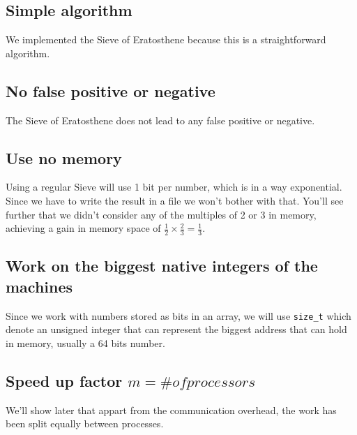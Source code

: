 

\subsection{Simple algorithm}
We implemented the Sieve of Eratosthene because this is a straightforward algorithm.
\subsection{No false positive or negative}
The Sieve of Eratosthene does not lead to any false positive or negative.
\subsection{Use no memory}
Using a regular Sieve will use 1 bit per number, which is in a way exponential. Since we have to write the result in a file we won't bother with that. You'll see further that we didn't consider any of the multiples of 2 or 3 in memory, achieving a gain in memory space of $\frac{1}{2}\times\frac{2}{3} = \frac{1}{3}$.
\subsection{Work on the biggest native integers of the machines}
Since we work with numbers stored as bits in an array, we will use \verb+size_t+ which denote an unsigned integer that can represent the biggest address that can hold in memory, usually a 64 bits number.
\subsection{Speed up factor $m = \# of processors$}
We'll show later that appart from the communication overhead, the work has been split equally between processes.




